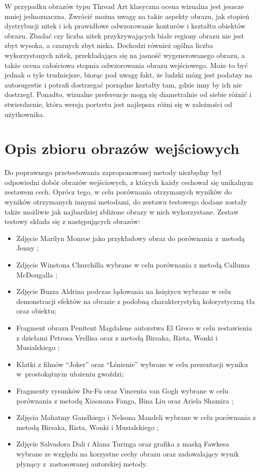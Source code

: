        W przypadku obrazów typu Thread Art klasyczna ocena wizualna jest jeszcze mniej jednoznaczna. Zwrócić można uwagę na takie aspekty obrazu, jak stopień dystrybucji nitek i ich prawidłowe odwzorowanie konturów i kształtu obiektów obrazu. Zbadać czy liczba nitek przykrywających białe regiony obrazu nie jest zbyt wysoka, a czarnych zbyt niska. Dochodzi również ogólna liczba wykorzystanych nitek, przekładająca się na jasność wygenerowanego obrazu, a także ocena całościowa stopnia odwzorowania obrazu wejściowego. Może to być jednak o tyle trudniejsze, biorąc pod uwagę fakt, że ludzki mózg jest podatny na autosugestie i potrafi dostrzegać porządne kształty tam, gdzie inny by ich nie dostrzegł. Ponadto, wizualne preferencje mogą się diametralnie od siebie różnić i stwierdzenie, która wersja portretu jest najlepsza różni się w zależności od użytkownika.
    
    \section{Opis zbioru obrazów wejściowych} \label{comp-dataset}
    Do poprawnego przetestowania zaproponowanej metody niezbędny był odpowiedni dobór obrazów wejściowych, z których każdy cechował się unikalnym zestawem cech. Oprócz tego, w celu porównania otrzymanych wyników do wyników otrzymanych innymi metodami, do zestawu testowego dodane zostały także możliwie jak najbardziej zbliżone obrazy w nich wykorzystane. Zestaw testowy składa się z następujących obrazów:
    \begin{itemize}
        \item Zdjęcie Marilyn Monroe jako przykładowy obraz do porównania z~metodą Jenny \cite{jenny-github};
        \item Zdjęcie Winstona Churchilla wybrane w celu porównania z metodą Calluma McDougalla \cite{callum-github};
        \item Zdjęcie Buzza Aldrina podczas lądowania na księżycu wybrane w celu demonstracji efektów na obrazie z podobną charakterystyką kolorystyczną tła oraz obiektu;
        \item Fragment obrazu Penitent Magdalene autorstwa El Greco w celu zestawienia z dziełami Petrosa Vrellisa \cite{new-way-to-knit} oraz z metodą Birsaka, Rista, Wonki i Musialskiego \cite{article-string-art-birsak};
        \item Klatki z filmów ``Joker'' oraz ``Lśnienie'' wybrane w celu prezentacji wyniku w~prostokątnym ułożeniu gwoździ;
        \item Fragmenty rysunków Du-Fu oraz Vincenta van Gogh wybrane w celu porównania z metodą Xiaonana Fanga, Bina Liu oraz Ariela Shamira \cite{article-string-art-xiaonan};
        \item Zdjęcia Mahatmy Gandhiego i Nelsona Mandeli wybrane w celu porównania z metodą Birsaka, Rista, Wonki i Musialskiego \cite{article-string-art-birsak};
        \item Zdjęcie Salvadora Dali i Alana Turinga oraz grafika z maską Fawkesa wybrane ze względu na korzystne cechy obrazu oraz zadowalający wynik płynący z~zastosowanej autorskiej metody.
    \end{itemize}
    \newpage

